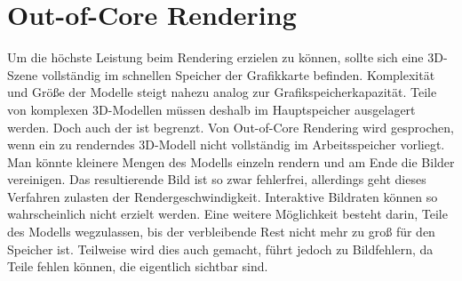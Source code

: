 \section{Out-of-Core Rendering}
\label{sec:relwork:oocrender}
Um die höchste Leistung beim Rendering erzielen zu können, sollte sich eine 3D-Szene vollständig im schnellen Speicher der Grafikkarte befinden. Komplexität und Größe der Modelle steigt nahezu analog zur Grafikspeicherkapazität. Teile von komplexen 3D-Modellen müssen deshalb im Hauptspeicher ausgelagert werden. Doch auch der ist begrenzt. Von Out-of-Core Rendering wird gesprochen, wenn ein zu renderndes 3D-Modell nicht vollständig im Arbeitsspeicher vorliegt. Man könnte kleinere Mengen des Modells einzeln rendern und am Ende die Bilder vereinigen. Das resultierende Bild ist so zwar fehlerfrei, allerdings geht dieses Verfahren zulasten der Rendergeschwindigkeit. Interaktive Bildraten können so wahrscheinlich nicht erzielt werden. Eine weitere Möglichkeit besteht darin, Teile des Modells wegzulassen, bis der verbleibende Rest nicht mehr zu groß für den Speicher ist. Teilweise wird dies auch gemacht, führt jedoch zu Bildfehlern, da Teile fehlen können, die eigentlich sichtbar sind.


